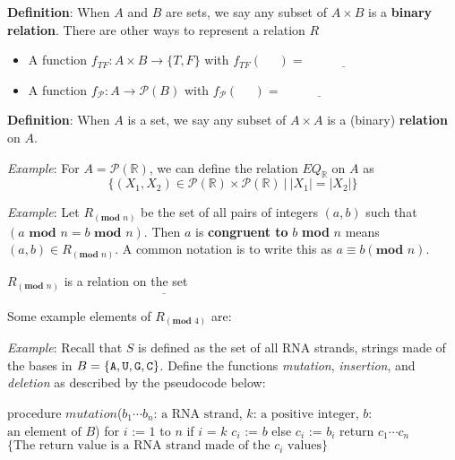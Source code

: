 \documentclass[12pt, oneside]{article}
\begin{document}
{\bf Definition}: When $A$ and $B$ are sets, we say any subset of $A \times B$ is a {\bf binary relation}. There 
are other ways to represent a relation $R$

\vspace{-20pt}

\begin{itemize}
\item A function $f_{TF} : A \times B \to \{T, F\}$
with $f_{TF}( ~~~~~~ ) = \underline{\phantom{\hspace{1in}}}$
\item A function $f_{\mathcal{P}} : A   \to \mathcal{P}(B)$ with $f_{\mathcal{P}}( ~~~~~~ ) = \underline{\phantom{\hspace{1in}}}$
\end{itemize}


{\bf Definition}: When $A$ is a set, we say any subset of $A \times A$ is a (binary) {\bf relation} on $A$.




{\it Example}: For $A = \mathcal{P}(\mathbb{R})$, we can define the relation $EQ_{\mathbb{R}}$ on $A$ as 
\[
\{ (X_1, X_2 ) \in\mathcal{P}(\mathbb{R})  \times \mathcal{P}(\mathbb{R}) ~|~ |X_1| = |X_2| \}
\]


\vfill

{\it Example}: Let $R_{(\textbf{mod } n)}$ be the set of all pairs of integers $(a, b)$ such that $(a \textbf{ mod } n = b \textbf{ mod } n)$.
Then $a$ is {\bf congruent to} $b$ \textbf{mod} $n$ means $(a, b) \in R_{(\textbf{mod } n)}$. A common notation is to write this as $a \equiv b (\textbf{mod } n)$.


$R_{(\textbf{mod } n)}$ is a relation on the set $\underline{\hspace{25em}}$


Some example elements of $R_{(\textbf{mod } 4)}$ are: \underline{\hspace{25em}}

\vfill
\newpage

{\it Example}: Recall that $S$ is defined as the set of all RNA strands, strings made of the bases in 
 $B = \{\texttt{A},\texttt{U},\texttt{G},\texttt{C}\}$. Define the functions \textit{mutation}, \textit{insertion}, and \textit{deletion} as described by the pseudocode below:

\begin{algorithm}
procedure $\textit{mutation}$($b_1\cdots b_n$: $\textrm{a RNA strand}$, $k$: $\textrm{a  positive integer}$, $b$: $\textrm{an  element of } B$)
for $i$ := $1$ to $n$
  if $i$ = $k$
    $c_i$ := $b$
  else
    $c_i$ := $b_i$
return $c_1\cdots c_n$ $\{ \textrm{The return value is a RNA strand made of the } c_i \textrm{ values}\}$
\end{algorithm}
\end{document}
